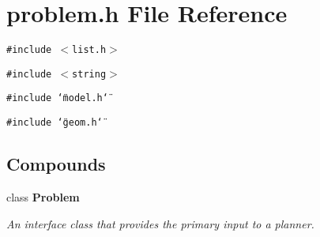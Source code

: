 \section{problem.h File Reference}
\label{problem_h}
{\tt \#include $<$list.h$>$}\par
{\tt \#include $<$string$>$}\par
{\tt \#include \char`\"{}model.h\char`\"{}}\par
{\tt \#include \char`\"{}geom.h\char`\"{}}\par
\subsection*{Compounds}
\begin{CompactItemize}
\item 
class {\bf Problem}
\begin{CompactList}\small\item\em An interface class that provides the primary input to a planner.\item\end{CompactList}\end{CompactItemize}

